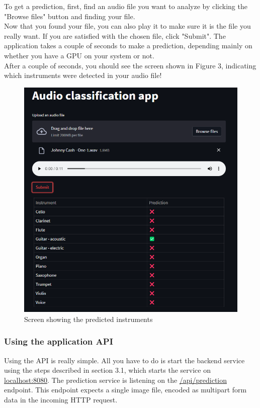 \documentclass{ol-softwaremanual}
\begin{document}
To get a prediction, first, find an audio file you want to analyze by clicking the "Browse files" button and finding your file.\\

Now that you found your file, you can also play it to make sure it is the file you really want. If you are satisfied with the chosen file, click "Submit". The application takes a couple of seconds to make a prediction, depending mainly on whether you have a GPU on your system or not. \\

After a couple of seconds, you should see the screen shown in Figure 3, indicating which instruments were detected in your audio file!

\begin{figure}[h]
\centering
\includegraphics[width=1.0\textwidth]{images/app_2.png}
\caption{\label{fig:wandb}Screen showing the predicted instruments}
\end{figure}

\subsubsection{Using the application API}

Using the API is really simple. All you have to do is start the backend service using the steps described in section 3.1, which starts the service on \url{localhost:8080}. The prediction service is listening on the \url{/api/prediction} endpoint. This endpoint expects a single  image file, encoded as multipart form data in the incoming HTTP request.
\end{document}
